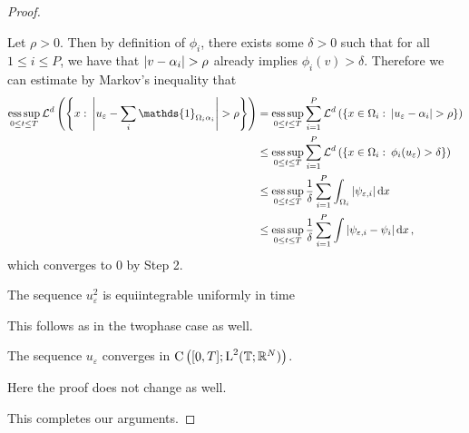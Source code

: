 \begin{proof}
\begin{description}[wide=0pt]
		Let $ \rho > 0 $. Then by definition of $ \phi_{ i } $, there exists 
		some $ \delta > 0 $ such that for all $ 1 \leq i \leq P $, we have that 
		$ \abs{ v - \alpha_{ i } } > \rho $ already implies $ \phi_{ i } ( v ) 
		> \delta $.
		Therefore we can estimate by Markov's inequality that
		\begin{align*}
			\esssup_{ 0 \leq t \leq T }
				\lm^{ d } \left(
					\left\{
						x 
						\, \colon \,
						\abs{ u_{ \varepsilon } - \sum_{ i } \mathds{ 1 }_{ \Omega_{ i } \alpha_{ i } } } > \rho 
					\right\}
				\right)
			& = 
			\esssup_{ 0 \leq t \leq T }
				\sum_{ i = 1 }^{ P }
					\lm^{ d }
						\left(
							\left\{
								x \in \Omega_{ i }
								\, \colon \,
								\abs{ u_{ \varepsilon } - \alpha_{ i } }
								> \rho
							\right\}	
						\right)
			\\
			& \leq
				\esssup_{ 0 \leq t \leq T }
					\sum_{ i = 1 }^{ P }
						\lm^{ d } \left(
							\left\{
								x \in \Omega_{ i }
								\, \colon \,
								\phi_{ i } ( u_{ \varepsilon } ) > \delta 
							\right\}
						\right)
			\\
			& \leq
			\esssup_{ 0 \leq t \leq T }
				\frac{ 1 }{ \delta }
				\sum_{ i = 1 }^{ P }
					\int_{ \Omega_{ i } }
						\abs{ \psi_{ \varepsilon , i } }
					\dd{ x }
			\\
			& \leq
			\esssup_{ 0 \leq t \leq T }
				\frac{ 1 }{ \delta }
				\sum_{ i = 1 }^{ P }
					\int
						\abs{ \psi_{ \varepsilon,  i } - \psi_{ i } }
					\dd{ x },
		\end{align*}
		which converges to $ 0 $ by Step 2.
		
		\item[Step 4:] The sequence $ u_{ \varepsilon }^{ 2 } $ is equiintegrable uniformly in time
		
		This follows as in the twophase case as well.
		
		\item[Step 5:] The sequence $ u_{ \varepsilon } $ converges in $ \operatorname{C} \left( [ 0 , T ] ; \operatorname{L}^{ 2 } ( \operatorname{\mathbb{T}} ; \mathbb{ R }^{ N } ) \right) $.
		
		Here the proof does not change as well.
	\end{description}
	This completes our arguments.
\end{proof}

